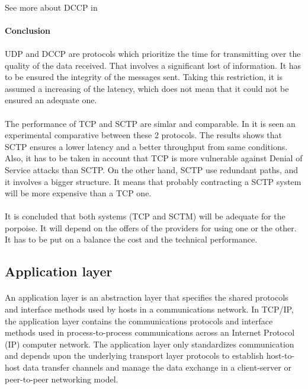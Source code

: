 \paragraph{}
See more about DCCP in \cite{DCCP}


\paragraph{} \textbf{Conclusion}
\paragraph{}
UDP and DCCP are protocols which prioritize the time for transmitting over the quality of the data received. That involves a significant lost of information. It has to be ensured the integrity of the messages sent. Taking this restriction, it is assumed a increasing of the latency, which does not mean that it could not be ensured an adequate one.
\paragraph{}
The performance of TCP and SCTP are simlar and comparable. In \cite{SCTP_TCP} it is seen an experimental comparative between these 2 protocols. The results shows that SCTP ensures a lower latency and a better throughput from same conditions. Also, it has to be taken in account that TCP is more vulnerable against Denial of Service attacks than SCTP. On the other hand, SCTP use redundant paths, and it involves a bigger structure. It means that probably contracting a SCTP system will be more expensive than a TCP one. 
\paragraph{}
It is concluded that both systems (TCP and SCTM) will be adequate for the porpoise. It will depend on the offers of the providers for using one or the other. It has to be put on a balance the cost and the technical performance.

\subsection{Application layer}
\paragraph{}
An application layer is an abstraction layer that specifies the shared protocols and interface methods used by hosts in a communications network. In TCP/IP, the application layer contains the communications protocols and interface methods used in process-to-process communications across an Internet Protocol (IP) computer network. The application layer only standardizes communication and depends upon the underlying transport layer protocols to establish host-to-host data transfer channels and manage the data exchange in a client-server or peer-to-peer networking model. 

